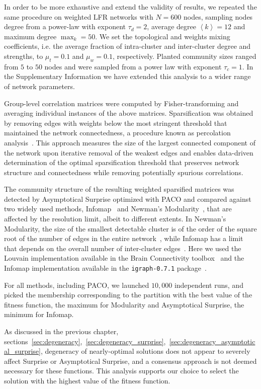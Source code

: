 In order to be more exhaustive and extend the validity of results, we repeated the same procedure on weighted LFR networks with $N=600$ nodes, sampling nodes degree from a power-law with exponent $\tau_d=2$, average degree $\left<k\right>=12$ and maximum degree $\max_k=50$.
We set the topological and weights mixing coefficients, i.e. the average fraction of intra-cluster and inter-cluster degree and strengths, to $\mu_t=0.1$ and $\mu_w=0.1$, respectively. Planted community sizes ranged from $5$ to $50$ nodes and were sampled from a power law with exponent $\tau_c=1$. In the Supplementary Information we have extended this analysis to a wider range of network parameters.

Group-level correlation matrices were computed by Fisher-transforming and averaging individual instances of the above matrices. Sparsification was obtained by removing edges with weights below the most stringent threshold that maintained the network connectedness, a procedure known as  percolation analysis~\cite{gallos2012,bardella2016a,alexander-bloch2010}. This approach measures the size of the largest connected component of the network upon iterative removal of the weakest edges and enables data-driven determination of the optimal sparsification threshold that preserves network structure and connectedness while removing potentially spurious correlations.

The community structure of the resulting weighted sparsified matrices was detected by Asymptotical Surprise optimized with PACO and compared against two widely used methods, Infomap~\cite{rosvall2008} and Newman's Modularity~\cite{blondel2008,newman2006}, that  are affected by the resolution limit, albeit to different extents. 
In Newman's Modularity, the size of the smallest detectable cluster is of the order of the square root of the number of edges in the entire network~\cite{fortunato2007}, while Infomap has a limit that depends on the overall number of inter-cluster edges~\cite{kawamoto2015}.
Here we used the Louvain implementation available in the Brain Connectivity toolbox~\cite{rubinov2010} and the Infomap implementation available in the \texttt{igraph-0.7.1} package~\cite{igraph2006}.

For all methods, including PACO, we launched $10,000$ independent runs, and picked the membership corresponding to the partition with the best value of the fitness function, the maximum for Modularity and Asymptotical Surprise, the minimum for Infomap.

As discussed in the previous chapter, sections~\ref{sec:degeneracy},~\ref{sec:degeneracy_surprise},~\ref{sec:degeneracy_asymptotical_surprise}, degeneracy of nearly-optimal solutions does not appear to severely affect Surprise or Asymptotical Surprise, and a consensus approach is not deemed necessary for these functions.
This analysis supports our choice to select the solution with the highest value of the fitness function.

